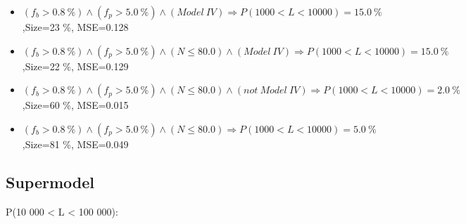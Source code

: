 \documentclass[numbered]{CSL}
\begin{document}
\begin{itemize}
\item $(f_b > 0.8~\%) \land (f_p > 5.0~\%) \land (Model~IV) \Rightarrow P(1 000 < L < 10 000) = 15.0~\%$,\hfill Size=23 \%, MSE=0.128
\item $(f_b > 0.8~\%) \land (f_p > 5.0~\%) \land (N \leq 80.0) \land (Model~IV) \Rightarrow P(1 000 < L < 10 000) = 15.0~\%$,\hfill Size=22 \%, MSE=0.129
\item $(f_b > 0.8~\%) \land (f_p > 5.0~\%) \land (N \leq 80.0) \land (not~Model~IV) \Rightarrow P(1 000 < L < 10 000) = 2.0~\%$,\hfill Size=60 \%, MSE=0.015
\item $(f_b > 0.8~\%) \land (f_p > 5.0~\%) \land (N \leq 80.0) \Rightarrow P(1 000 < L < 10 000) = 5.0~\%$,\hfill Size=81 \%, MSE=0.049
\end{itemize}

\subsection{Supermodel}
P(10 000 < L < 100 000):
\end{document}
